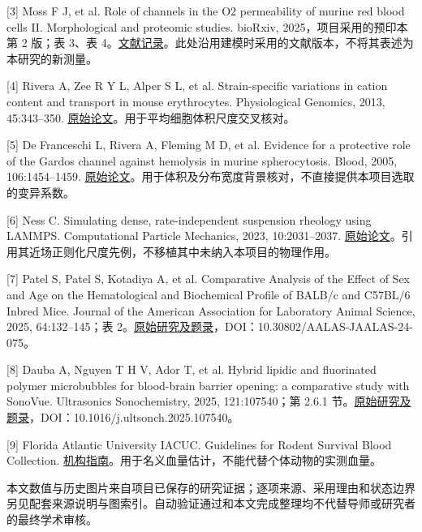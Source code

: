 \documentclass[UTF8,a4paper,11pt,fontset=fandol]{ctexart}
\begin{document}
[3] Moss F J, et al. Role of channels in the O2 permeability of murine red blood cells II. Morphological and proteomic studies. bioRxiv, 2025，项目采用的预印本第 2 版；表 3、表 4。\href{https://pmc.ncbi.nlm.nih.gov/articles/PMC12132290/}{文献记录}。此处沿用建模时采用的文献版本，不将其表述为本研究的新测量。

[4] Rivera A, Zee R Y L, Alper S L, et al. Strain-specific variations in cation content and transport in mouse erythrocytes. Physiological Genomics, 2013, 45:343–350. \href{https://doi.org/10.1152/physiolgenomics.00143.2012}{原始论文}。用于平均细胞体积尺度交叉核对。

[5] De Franceschi L, Rivera A, Fleming M D, et al. Evidence for a protective role of the Gardos channel against hemolysis in murine spherocytosis. Blood, 2005, 106:1454–1459. \href{https://doi.org/10.1182/blood-2005-01-0368}{原始论文}。用于体积及分布宽度背景核对，不直接提供本项目选取的变异系数。

[6] Ness C. Simulating dense, rate-independent suspension rheology using LAMMPS. Computational Particle Mechanics, 2023, 10:2031–2037. \href{https://doi.org/10.1007/s40571-023-00605-x}{原始论文}。引用其近场正则化尺度先例，不移植其中未纳入本项目的物理作用。

[7] Patel S, Patel S, Kotadiya A, et al. Comparative Analysis of the Effect of Sex and Age on the Hematological and Biochemical Profile of BALB/c and C57BL/6 Inbred Mice. Journal of the American Association for Laboratory Animal Science, 2025, 64:132–145；表 2。\href{https://pmc.ncbi.nlm.nih.gov/articles/PMC11808370/}{原始研究及题录}，DOI：10.30802/AALAS-JAALAS-24-075。

[8] Dauba A, Nguyen T H V, Ador T, et al. Hybrid lipidic and fluorinated polymer microbubbles for blood-brain barrier opening: a comparative study with SonoVue. Ultrasonics Sonochemistry, 2025, 121:107540；第 2.6.1 节。\href{https://pmc.ncbi.nlm.nih.gov/articles/PMC12445601/}{原始研究及题录}，DOI：10.1016/j.ultsonch.2025.107540。

[9] Florida Atlantic University IACUC. Guidelines for Rodent Survival Blood Collection. \href{https://www.fau.edu/research-admin/research-integrity/files/guidelines-for-rodent-survival-blood-collection-final.pdf}{机构指南}。用于名义血量估计，不能代替个体动物的实测血量。

本文数值与历史图片来自项目已保存的研究证据；逐项来源、采用理由和状态边界另见配套来源说明与图索引。自动验证通过和本文完成整理均不代替导师或研究者的最终学术审核。
\end{document}
